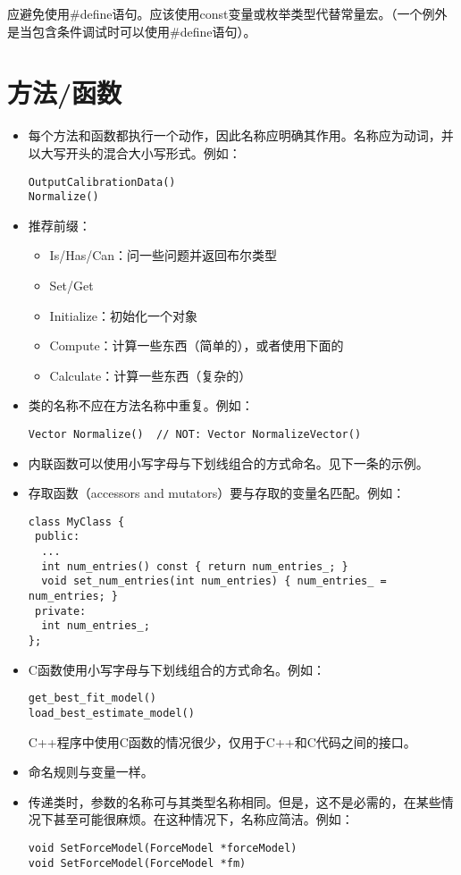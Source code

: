 应避免使用\#define语句。应该使用const变量或枚举类型代替常量宏。（一个例外是当包含条件调试时可以使用\#define语句）。


\section{方法/函数}
\begin{itemize}
  \item 每个方法和函数都执行一个动作，因此名称应明确其作用。名称应为动词，并以大写开头的混合大小写形式。例如：
  \begin{verbatim}
OutputCalibrationData()
Normalize()
  \end{verbatim}
  \item 推荐前缀：
  \begin{itemize}
    \item Is/Has/Can：问一些问题并返回布尔类型
    \item Set/Get
    \item Initialize：初始化一个对象
    \item Compute：计算一些东西（简单的），或者使用下面的
    \item Calculate：计算一些东西（复杂的）
  \end{itemize}
  \item 类的名称不应在方法名称中重复。例如：
  \begin{verbatim}
Vector Normalize()  // NOT: Vector NormalizeVector()
  \end{verbatim}
  \item 内联函数可以使用小写字母与下划线组合的方式命名。见下一条的示例。
  \item 存取函数（accessors and mutators）要与存取的变量名匹配。例如：
  \begin{verbatim}
class MyClass {
 public:
  ...
  int num_entries() const { return num_entries_; }
  void set_num_entries(int num_entries) { num_entries_ = num_entries; }
 private:
  int num_entries_;
};
  \end{verbatim}
  \item C函数使用小写字母与下划线组合的方式命名。例如：
  \begin{verbatim}
get_best_fit_model()
load_best_estimate_model()
  \end{verbatim}

  C++程序中使用C函数的情况很少，仅用于C++和C代码之间的接口。
\end{itemize}
\begin{itemize}
  \item 命名规则与变量一样。
  \item 传递类时，参数的名称可与其类型名称相同。但是，这不是必需的，在某些情况下甚至可能很麻烦。在这种情况下，名称应简洁。例如：
  \begin{verbatim}
void SetForceModel(ForceModel *forceModel)
void SetForceModel(ForceModel *fm)
  \end{verbatim}
\end{itemize}


